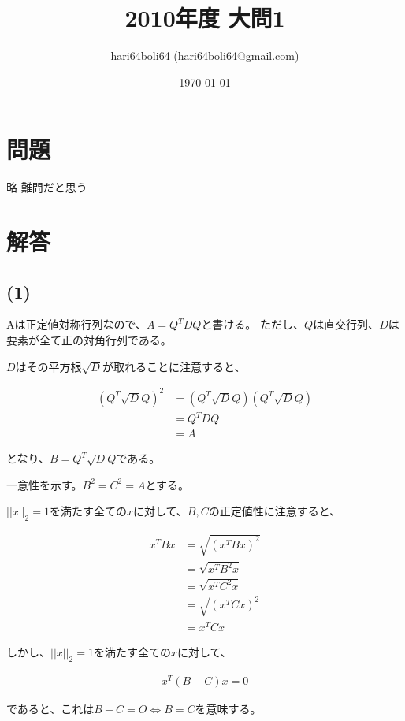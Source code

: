 \documentclass[a4paper, 10pt, dvipdfmx]{jlreq}
\begin{document}
\title{2010年度 大問1}
\author{hari64boli64 (hari64boli64@gmail.com)}
\date{\today}
\maketitle

\section{問題}

略 難問だと思う

\section{解答}

\subsection*{(1)}

Aは正定値対称行列なので、$A=Q^TDQ$と書ける。
ただし、$Q$は直交行列、$D$は要素が全て正の対角行列である。

$D$はその平方根$\sqrt{D}$が取れることに注意すると、

\begin{align*}
  (Q^T\sqrt{D}Q)^2 & =(Q^T\sqrt{D}Q)(Q^T\sqrt{D}Q) \\
                   & =Q^TDQ                        \\
                   & =A
\end{align*}

となり、$B=Q^T\sqrt{D}Q$である。

一意性を示す。$B^2=C^2=A$とする。

$||x||_2=1$を満たす全ての$x$に対して、$B,C$の正定値性に注意すると、

\begin{align*}
  x^TBx & =\sqrt{(x^TBx)^2} \\
        & =\sqrt{x^TB^2x}   \\
        & =\sqrt{x^TC^2x}   \\
        & =\sqrt{(x^TCx)^2} \\
        & =x^TCx
\end{align*}

しかし、$||x||_2=1$を満たす全ての$x$に対して、

\begin{align*}
  x^T(B-C)x =0
\end{align*}

であると、これは$B-C=O \Leftrightarrow B=C$を意味する。
\end{document}
